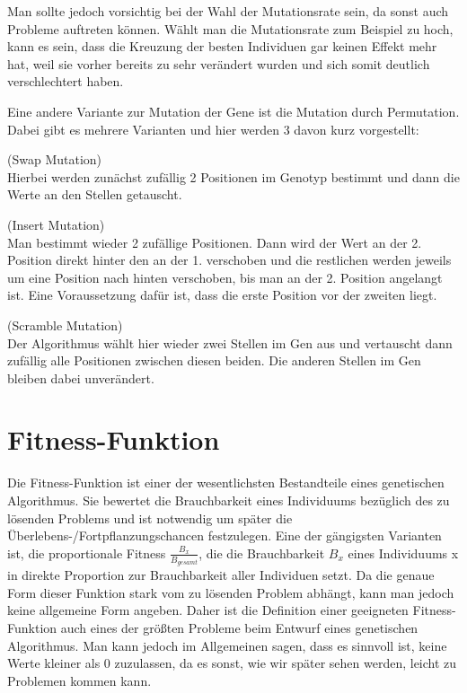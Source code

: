 Man sollte jedoch vorsichtig bei der Wahl der Mutationsrate sein, da sonst auch Probleme auftreten können. Wählt man die Mutationsrate zum Beispiel zu hoch, kann es sein, dass die Kreuzung der besten Individuen gar keinen Effekt mehr hat, weil sie vorher bereits zu sehr verändert wurden und sich somit deutlich verschlechtert haben.

Eine andere Variante zur Mutation der Gene ist die Mutation durch Permutation. Dabei gibt es mehrere Varianten und hier werden 3 davon kurz vorgestellt:
\setcounter{algo}{0}
\begin{algo}(Swap Mutation)\\
	Hierbei werden zunächst zufällig 2 Positionen im Genotyp bestimmt und dann die Werte an den Stellen getauscht.
\end{algo}
\begin{algo}(Insert Mutation)\\
	Man bestimmt wieder 2 zufällige Positionen. Dann wird der Wert an der 2. Position direkt hinter den an der 1. verschoben und die restlichen werden jeweils um eine Position nach hinten verschoben, bis man an der 2. Position angelangt ist. Eine Voraussetzung dafür ist, dass die erste Position vor der zweiten liegt.
\end{algo}
\begin{algo}(Scramble Mutation)\\
	Der Algorithmus wählt hier wieder zwei Stellen im Gen aus und vertauscht dann zufällig alle Positionen zwischen diesen beiden. Die anderen Stellen im Gen bleiben dabei unverändert.
\end{algo}

\section{Fitness-Funktion}
Die Fitness-Funktion ist einer der wesentlichsten Bestandteile eines genetischen Algorithmus. Sie bewertet die Brauchbarkeit eines Individuums bezüglich des zu lösenden Problems und ist notwendig um später die Überlebens-/Fortpflanzungschancen festzulegen. Eine der gängigsten Varianten ist, die proportionale Fitness $\frac{B_x}{B_{gesamt}}$, die die Brauchbarkeit $B_x$ eines Individuums x in direkte Proportion zur Brauchbarkeit aller Individuen setzt. Da die genaue Form dieser Funktion stark vom zu lösenden Problem abhängt, kann man jedoch keine allgemeine Form angeben. Daher ist die Definition einer geeigneten Fitness-Funktion auch eines der größten Probleme beim Entwurf eines genetischen Algorithmus. Man kann jedoch im Allgemeinen sagen, dass es sinnvoll ist, keine Werte kleiner als 0 zuzulassen, da es sonst, wie wir später sehen werden, leicht zu Problemen kommen kann.

